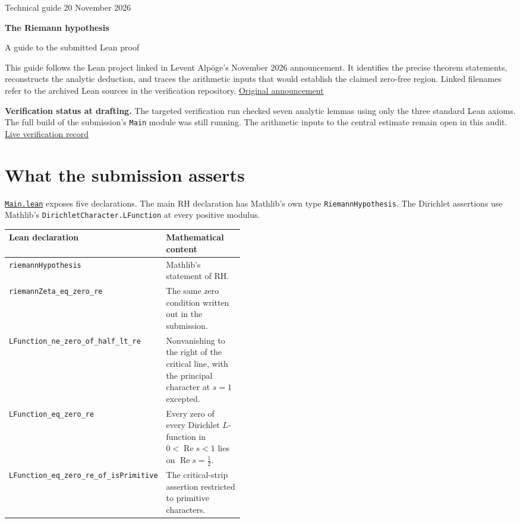 \documentclass[11pt,a4paper]{article}
\newcommand{\repo}{https://github.com/LiRunGuo/riemann-lean-verification}
\newcommand{\code}[1]{\texttt{#1}}
\newcommand{\src}[2]{\href{\repo/blob/main/lean/src/#1}{\mbox{\nolinkurl{#2}}}}
\newcommand{\evid}[2]{\href{\repo/blob/main/#1}{#2}}
\newcommand{\RePart}{\operatorname{Re}}
\newcommand{\note}[1]{\par\noindent\colorbox{pale}{\parbox{\dimexpr\linewidth-2\fboxsep\relax}{\small\strut #1\strut}}\par}
\begin{document}
\thispagestyle{plain}
{\large\color{accent} Technical guide \hfill 20 November 2026}\par
\vspace{8mm}
{\Huge\bfseries The Riemann hypothesis\par}
\vspace{2mm}
{\LARGE A guide to the submitted Lean proof\par}
\vspace{5mm}

This guide follows the Lean project linked in Levent Alpöge's November 2026
announcement. It identifies the precise theorem statements, reconstructs the
analytic deduction, and traces the arithmetic inputs that would establish the
claimed zero-free region. Linked filenames refer to the archived Lean sources
in the verification repository. \href{https://alpo.ge/remark.pdf}{Original announcement}

\note{\textbf{Verification status at drafting.} The targeted verification run checked
seven analytic lemmas using only the three standard Lean axioms. The full build
of the submission's \code{Main} module was still running. The arithmetic
inputs to the central estimate remain open in this audit.
\evid{evidence/status.md}{Live verification record}}

\section{What the submission asserts}

\src{Main.lean}{Main.lean} exposes five declarations. The main RH declaration
has Mathlib's own type \code{RiemannHypothesis}. The Dirichlet assertions
use Mathlib's \code{DirichletCharacter.LFunction} at every positive modulus.

\begin{tabularx}{\linewidth}{@{}>{\raggedright\arraybackslash}p{0.46\linewidth}X@{}}
\toprule
Lean declaration & Mathematical content \\
\midrule
\nolinkurl{riemannHypothesis} & Mathlib's statement of RH. \\
\nolinkurl{riemannZeta_eq_zero_re} & The same zero condition written out in the submission. \\
\nolinkurl{LFunction_ne_zero_of_half_lt_re} & Nonvanishing to the right of the critical line, with the principal character at $s=1$ excepted. \\
\nolinkurl{LFunction_eq_zero_re} & Every zero of every Dirichlet $L$-function in $0<\RePart s<1$ lies on $\RePart s=\tfrac12$. \\
\nolinkurl{LFunction_eq_zero_re_of_isPrimitive} & The critical-strip assertion restricted to primitive characters. \\
\bottomrule
\end{tabularx}
\end{document}
